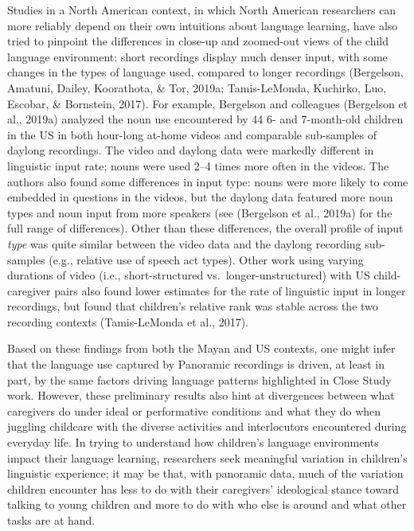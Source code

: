 \documentclass[,man,floatsintext]{apa6}
\begin{document}
Studies in a North American context, in which North American researchers
can more reliably depend on their own intuitions about language
learning, have also tried to pinpoint the differences in close-up and
zoomed-out views of the child language environment: short recordings
display much denser input, with some changes in the types of language
used, compared to longer recordings (Bergelson, Amatuni, Dailey,
Koorathota, \& Tor, 2019a; Tamis-LeMonda, Kuchirko, Luo, Escobar, \&
Bornstein, 2017). For example, Bergelson and colleagues (Bergelson et
al., 2019a) analyzed the noun use encountered by 44 6- and 7-month-old
children in the US in both hour-long at-home videos and comparable
sub-samples of daylong recordings. The video and daylong data were
markedly different in linguistic input rate; nouns were used 2--4 times
more often in the videos. The authors also found some differences in
input type: nouns were more likely to come embedded in questions in the
videos, but the daylong data featured more noun types and noun input
from more speakers (see (Bergelson et al., 2019a) for the full range of
differences). Other than these differences, the overall profile of input
\emph{type} was quite similar between the video data and the daylong
recording sub-samples (e.g., relative use of speech act types). Other
work using varying durations of video (i.e., short-structured
vs.~longer-unstructured) with US child-caregiver pairs also found lower
estimates for the rate of linguistic input in longer recordings, but
found that children's relative rank was stable across the two recording
contexts (Tamis-LeMonda et al., 2017).

Based on these findings from both the Mayan and US contexts, one might
infer that the language use captured by Panoramic recordings is driven,
at least in part, by the same factors driving language patterns
highlighted in Close Study work. However, these preliminary results also
hint at divergences between what caregivers do under ideal or
performative conditions and what they do when juggling childcare with
the diverse activities and interlocutors encountered during everyday
life. In trying to understand how children's language environments
impact their language learning, researchers seek meaningful variation in
children's linguistic experience; it may be that, with panoramic data,
much of the variation children encounter has less to do with their
caregivers' ideological stance toward talking to young children and more
to do with who else is around and what other tasks are at hand.
\end{document}
